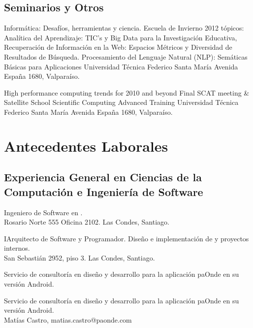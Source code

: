 \documentclass[11pt,letterpaper,roman]{moderncv}
\begin{document}
\subsection{Seminarios y Otros}

 {Informática: Desafíos, herramientas y ciencia.}
{Escuela de Invierno 2012} {tópicos: Analítica del Aprendizaje: TIC's y Big Data
para la Investigación Educativa, Recuperación de Información en la Web: Espacios
Métricos y Diversidad de Resultados de Búsqueda. Procesamiento del Lenguaje
Natural (NLP): Semáticas Básicas para Aplicaciones} {Universidad T\'ecnica
Federico Santa Mar\'ia} {Avenida España 1680, Valpara\'iso.}
	
	
 {High performance computing trends for 2010 and beyond}
{Final SCAT meeting \& Satellite School} {Scientific Computing Advanced
Training} {Universidad T\'ecnica Federico Santa Mar\'ia} {Avenida España 1680,
Valpara\'iso.}


\section{Antecedentes Laborales}



\subsection{Experiencia General en Ciencias de la Computación e Ingeniería de
Software}

 {\se} {\instagisSPA} {\stgo} {}
{Ingeniero de Software en \instagis. \\ Rosario Norte 555 Oficina 2102. Las Condes, Santiago.}


 {\pe} {\mapcity} {\stgo} {}
{IArquitecto de Software y Programador. Diseño e implementación de \mientorno   y proyectos internos. \\ San Sebastián 2952, piso 3. Las Condes, Santiago.}

 {\scd} {\paonde} {\stgo} {}
{Servicio de consultoría en diseño y desarrollo para la aplicación paOnde en
su versión Android.}

 {\scd} {\paonde} {\stgo} {}
{Servicio de consultoría en diseño y desarrollo para la aplicación paOnde en
su versión Android. \\ Matías Castro, matias.castro@paonde.com}
\end{document}
